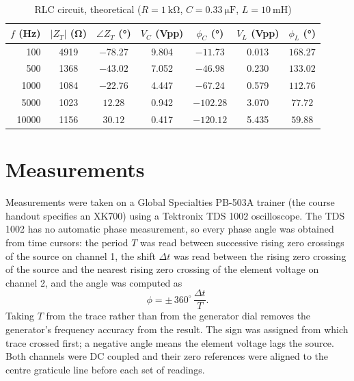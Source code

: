 \documentclass[11pt]{article}
\begin{document}
\begin{table}[H]
    \centering
    \caption{RLC circuit, theoretical ($R = \SI{1}{\kilo\ohm}$, $C = \SI{0.33}{\micro\farad}$, $L = \SI{10}{\milli\henry}$)}
    \begin{tabular}{rcccccc}
        \toprule
        $f$ (Hz) & $|Z_T|$ (\si{\ohm}) & $\angle Z_T$ (\si{\degree})
                 & $V_C$ (Vpp) & $\phi_C$ (\si{\degree})
                 & $V_L$ (Vpp) & $\phi_L$ (\si{\degree}) \\
        \midrule
        100    & 4919 & $-78.27$ & 9.804 & $-11.73$  & 0.013 & $168.27$ \\
        500    & 1368 & $-43.02$ & 7.052 & $-46.98$  & 0.230 & $133.02$ \\
        1000   & 1084 & $-22.76$ & 4.447 & $-67.24$  & 0.579 & $112.76$ \\
        5000   & 1023 & $12.28$  & 0.942 & $-102.28$ & 3.070 & $77.72$  \\
        10000  & 1156 & $30.12$  & 0.417 & $-120.12$ & 5.435 & $59.88$  \\
        \bottomrule
    \end{tabular}
\end{table}

\section*{Measurements}

Measurements were taken on a Global Specialties PB-503A trainer (the course
handout specifies an XK700) using a Tektronix TDS 1002 oscilloscope. The TDS 1002
has no automatic phase measurement, so every phase angle was obtained from time
cursors: the period $T$ was read between successive rising zero crossings of the
source on channel 1, the shift $\Delta t$ was read between the rising zero
crossing of the source and the nearest rising zero crossing of the element
voltage on channel 2, and the angle was computed as
\[
    \phi = \pm\, 360^\circ \, \frac{\Delta t}{T}.
\]
Taking $T$ from the trace rather than from the generator dial removes the
generator's frequency accuracy from the result. The sign was assigned from which
trace crossed first; a negative angle means the element voltage lags the source.
Both channels were DC coupled and their zero references were aligned to the
centre graticule line before each set of readings.
\end{document}
